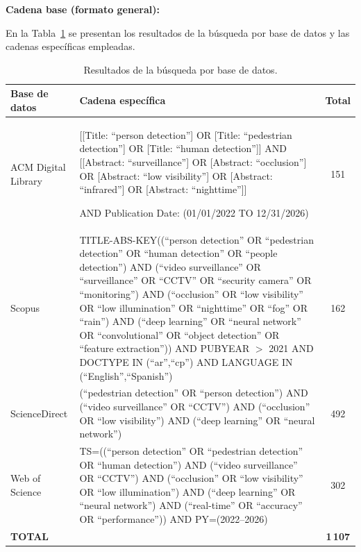 \documentclass[12pt, a4paper]{article}
\begin{document}
\noindent\textbf{Cadena base (formato general):}
\begin{center}
\end{center}

En la Tabla~\ref{tab:busqueda} se presentan los resultados de la
b\'{u}squeda por base de datos y las cadenas espec\'{i}ficas empleadas.

\begin{table}[H]
\centering
\caption{Resultados de la b\'{u}squeda por base de datos.}
\label{tab:busqueda}
\small
\begin{tabularx}{\linewidth}{lXc}
\toprule
\textbf{Base de datos} & \textbf{Cadena espec\'{i}fica} & \textbf{Total} \\
\midrule
ACM Digital Library &
{\ttfamily\raggedright [[Title: ``person detection''] OR [Title: ``pedestrian
detection''] OR [Title: ``human detection'']] AND [[Abstract:
``surveillance''] OR [Abstract: ``occlusion''] OR [Abstract: ``low
visibility''] OR [Abstract: ``infrared''] OR [Abstract: ``nighttime'']]}
AND Publication Date: (01/01/2022 TO 12/31/2026)
& 151 \\
\midrule
Scopus &
\small TITLE-ABS-KEY((``person detection'' OR ``pedestrian detection'' OR
``human detection'' OR ``people detection'') AND (``video surveillance''
OR ``surveillance'' OR ``CCTV'' OR ``security camera'' OR ``monitoring'')
AND (``occlusion'' OR ``low visibility'' OR ``low illumination'' OR
``nighttime'' OR ``fog'' OR ``rain'') AND (``deep learning'' OR ``neural
network'' OR ``convolutional'' OR ``object detection'' OR ``feature
extraction'')) AND PUBYEAR $>$ 2021 AND DOCTYPE IN (``ar'',``cp'') AND
LANGUAGE IN (``English'',``Spanish'')
& 162 \\
\midrule
ScienceDirect &
(``pedestrian detection'' OR ``person detection'') AND (``video
surveillance'' OR ``CCTV'') AND (``occlusion'' OR ``low visibility'')
AND (``deep learning'' OR ``neural network'')
& 492 \\
\midrule
Web of Science &
TS=((``person detection'' OR ``pedestrian detection'' OR ``human
detection'') AND (``video surveillance'' OR ``CCTV'') AND (``occlusion''
OR ``low visibility'' OR ``low illumination'') AND (``deep learning'' OR
``neural network'') AND (``real-time'' OR ``accuracy'' OR
``performance'')) AND PY=(2022--2026)
& 302 \\
\midrule
\textbf{TOTAL} & & \textbf{1\,107} \\
\bottomrule
\end{tabularx}
\end{table}
\end{document}
